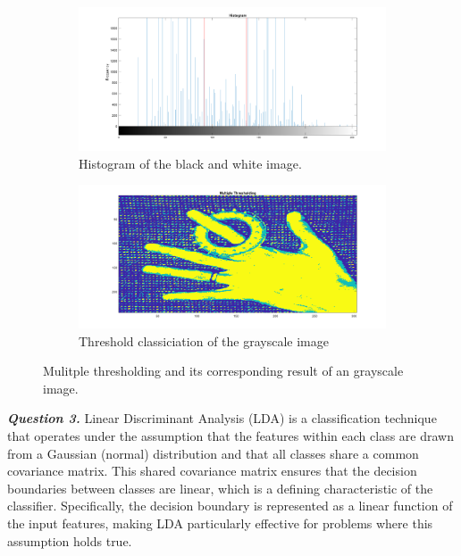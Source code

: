 \documentclass[12pt]{article}
\begin{document}
\begin{figure}[htbp!]
  \begin{subfigure}[b]{0.5\textwidth}
       \centering
       \includegraphics[width=0.9\linewidth]{images/Q2_hist.png}
       \caption{Histogram of the black and white image.}
       \label{fig:Q2_hist}
   \end{subfigure}
   \hfill
   \begin{subfigure}[b]{0.5\textwidth}
       \centering
       \includegraphics[width=0.9\linewidth]{images/Q2.png}
       \caption{Threshold classiciation of the grayscale image}
       \label{fig:Q2_im}
   \end{subfigure}
      \caption{Mulitple thresholding and its corresponding result of an grayscale image.}
      \label{fig:Q2}
\end{figure}


\textbf{\emph{Question 3.}}
Linear Discriminant Analysis (LDA) is a classification technique that operates under the assumption that the features within each class are drawn from a Gaussian (normal) distribution and that all classes share a common covariance matrix. This shared covariance matrix ensures that the decision boundaries between classes are linear, which is a defining characteristic of the classifier. Specifically, the decision boundary is represented as a linear function of the input features, making LDA particularly effective for problems where this assumption holds true.
\end{document}
